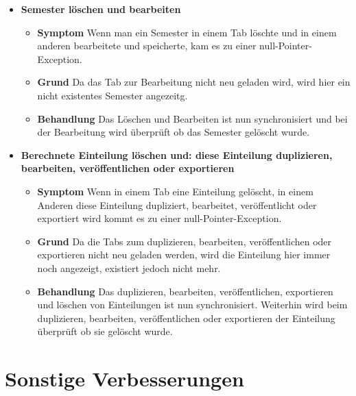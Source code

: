 \documentclass[parskip=full]{scrartcl}
\newcommand{\fehler}[4]{\textbf{#1}
 							\begin{itemize}
 							  \item \textbf{Symptom}  #2
 							  \item \textbf{Grund} #3
 							  \item \textbf{Behandlung} #4
 							\end{itemize}}
\newcommand{\code}[1]{{\ttfamily #1}}
\begin{document}
\begin{itemize}
{    kann man das aktive Semester nun nur noch umstellen, wenn die
    Einteilungswarteschlange leer ist.}
    \item \fehler{Semester löschen und bearbeiten}{Wenn man ein Semester in
    einem Tab löschte und in einem anderen bearbeitete und speicherte, kam es zu
    einer \code{null}-Pointer-Exception. }{Da das Tab zur Bearbeitung nicht
    neu geladen wird, wird hier ein nicht existentes Semester angezeitg.}{Das
    Löschen und Bearbeiten ist nun synchronisiert und bei der Bearbeitung wird
    überprüft ob das Semester gelöscht wurde.}
    \item \fehler{Berechnete Einteilung löschen und: diese Einteilung
    duplizieren, bearbeiten, veröffentlichen oder exportieren}{Wenn in
    einem Tab eine Einteilung gelöscht, in einem Anderen diese Einteilung
    dupliziert, bearbeitet, veröffentlicht oder exportiert wird kommt es zu
    einer \code{null}-Pointer-Exception. }{Da die Tabs zum duplizieren,
    bearbeiten, veröffentlichen oder exportieren nicht neu geladen werden,
    wird die Einteilung hier immer noch angezeigt, existiert jedoch nicht
    mehr.}{Das duplizieren, bearbeiten, veröffentlichen, exportieren und
    löschen von Einteilungen ist nun synchronisiert. Weiterhin wird beim
    duplizieren, bearbeiten, veröffentlichen oder exportieren der Einteilung
    überprüft ob sie gelöscht wurde.}
\end{itemize}


\section{Sonstige Verbesserungen}
\end{document}
